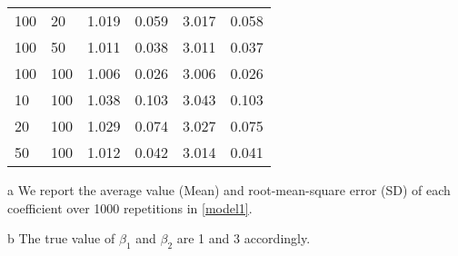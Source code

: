 \documentclass[a4paper]{article}
\begin{document}
\begin{table}[h]
\begin{threeparttable}
\begin{tabular}{llllll}
100 & 20  & 1.019                                                       & 0.059 & 3.017                                                       & 0.058 \\
100 & 50  & 1.011                                                       & 0.038 & 3.011                                                       & 0.037 \\
100 & 100 & 1.006                                                       & 0.026 & 3.006                                                       & 0.026 \\
10  & 100 & 1.038                                                       & 0.103 & 3.043                                                       & 0.103 \\
20  & 100 & 1.029                                                       & 0.074 & 3.027                                                       & 0.075 \\
50  & 100 & 1.012                                                       & 0.042 & 3.014                                                       & 0.041 \\
 \hline
\end{tabular}

\begin{tablenotes}
        \footnotesize
        \item[a]  We report the average value (Mean) and root-mean-square error (SD) of each coefficient over 1000 repetitions in \eqref{model1}.
        \item[b] The true value of $\beta_1$ and $\beta_2$ are 1 and 3 accordingly.
      \end{tablenotes}
\end{threeparttable}

\end{table}
\end{document}
